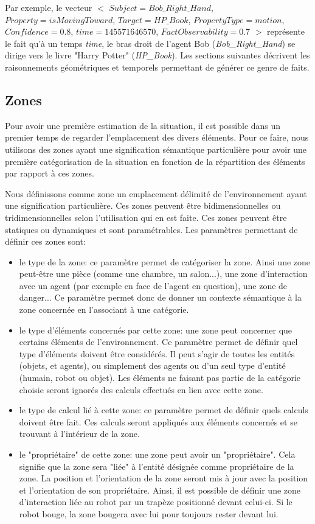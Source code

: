 \documentclass[a4paper,11pt,twoside]{StyleThese}
\begin{document}
Par exemple, le vecteur 
$<$ $Subject = Bob\_Right\_Hand$, $Property = isMovingToward$, $Target = HP\_Book$, $PropertyType = motion$, $Confidence = 0.8$, $time = 145571646570$, $FactObservability = 0.7$ $>$ représente le fait qu'à un temps \textit{time}, le bras droit de l'agent Bob (\textit{Bob\_Right\_Hand}) se dirige vers le livre "Harry Potter" (\textit{HP\_Book}).
Les sections suivantes décrivent les raisonnements géométriques et temporels 
permettant de générer ce genre de faits.


\subsection{Zones}
\label{sec:zones}

Pour avoir une première estimation de la situation, il est possible dans un premier temps de regarder l'emplacement des divers éléments. Pour ce faire, nous utilisons des zones ayant une signification sémantique particulière pour avoir une première catégorisation de la situation en fonction de la répartition des éléments par rapport à ces zones.

Nous définissons comme zone un emplacement délimité de l'environnement ayant une signification particulière. Ces zones peuvent être bidimensionnelles ou tridimensionnelles selon l'utilisation qui en est faite. Ces zones peuvent être statiques ou dynamiques et sont paramétrables. Les paramètres permettant de définir ces zones sont:
\begin{itemize}
\item le type de la zone: ce paramètre permet de catégoriser la zone. Ainsi une zone peut-être une pièce (comme une chambre, un salon...), une zone d'interaction avec un agent (par exemple en face de l'agent en question), une zone de danger...
Ce paramètre permet donc de donner un contexte sémantique à la zone concernée en l'associant à une catégorie.
\item le type d'éléments concernés par cette zone: une zone peut concerner que certains éléments de l'environnement. Ce paramètre permet de définir quel type d'éléments doivent être considérés. Il peut s'agir de toutes les entités (objets, et agents), ou simplement des agents ou d'un seul type d'entité (humain, robot ou objet). Les éléments ne faisant pas partie de la catégorie choisie seront ignorés des calculs effectués en lien avec cette zone.
\item le type de calcul lié à cette zone: ce paramètre permet de définir quels calculs doivent être fait. Ces calculs seront appliqués aux éléments concernés et se trouvant à l'intérieur de la zone.
\item le "propriétaire" de cette zone: une zone peut avoir un "propriétaire". Cela signifie que la zone sera "liée" à l'entité désignée comme propriétaire de la zone.  La position et l'orientation de la zone seront mis à jour avec la position et l'orientation de son propriétaire. Ainsi, il est possible de définir une zone d'interaction liée au robot par un trapèze positionné devant celui-ci. Si le robot bouge, la zone bougera avec lui pour toujours rester devant lui.
\end{itemize}
\end{document}
